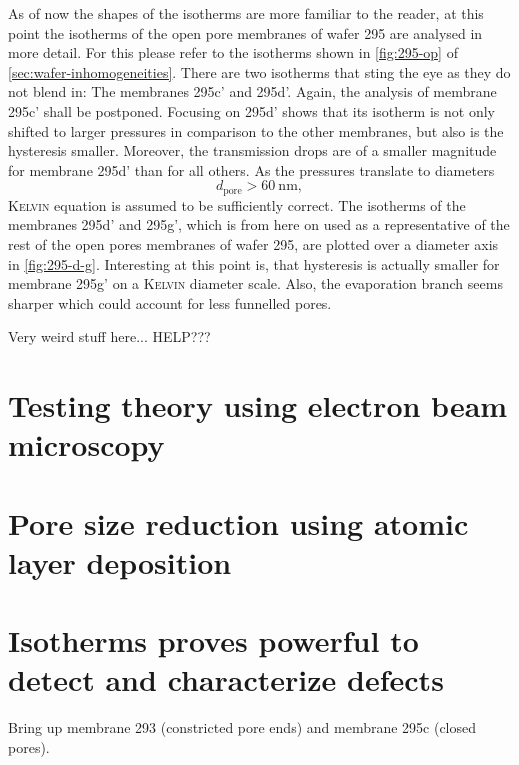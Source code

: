 \documentclass[../thesis.tex]{subfiles}
\begin{document}
        As of now the shapes of the isotherms are more familiar to the reader, at this point the isotherms of the open pore membranes of wafer 295 are analysed in more detail. For this please refer to the isotherms shown in \cref{fig:295-op} of \cref{sec:wafer-inhomogeneities}. There are two isotherms that sting the eye as they do not blend in: The membranes 295c' and 295d'. Again, the analysis of membrane 295c' shall be postponed. Focusing on 295d' shows that its isotherm is not only shifted to larger pressures in comparison to the other membranes, but also is the hysteresis smaller. Moreover, the transmission drops are of a smaller magnitude for membrane 295d' than for all others. As the pressures translate to diameters
        \begin{equation}
          d_\mathrm{pore}> \SI{60}{\nano\meter},
        \end{equation}
        \textsc{Kelvin} equation is assumed to be sufficiently correct. The isotherms of the membranes 295d' and 295g', which is from here on used as a representative of the rest of the open pores membranes of wafer 295, are plotted over a diameter axis in \cref{fig:295-d-g}. Interesting at this point is, that hysteresis is actually smaller for membrane 295g' on a \textsc{Kelvin} diameter scale. Also, the evaporation branch seems sharper which could account for less funnelled pores.
        \medskip

        Very weird stuff here... HELP???

        


      \section{Testing theory using electron beam microscopy}
      \label{sec:testing-theory}


      \section{Pore size reduction using atomic layer deposition}


      \section{Isotherms proves powerful to detect and characterize defects}
      \label{sec:theory-and-defects}

      Bring up membrane 293 (constricted pore ends) and membrane 295c (closed pores).
\end{document}
